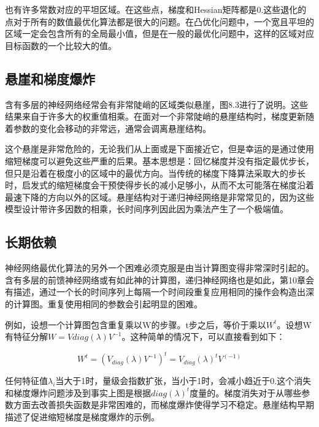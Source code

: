 也有许多常数对应的平坦区域。在这些点，梯度和Hessian矩阵都是0.这些退化的点对于所有的数值最优化算法都是很大的问题。在凸优化问题中，一个宽且平坦的区域一定会包含所有的全局最小值，但是在一般的最优化问题中，这样的区域对应目标函数的一个比较大的值。

\subsection{悬崖和梯度爆炸}

含有多层的神经网络经常会有非常陡峭的区域类似悬崖，图8.3进行了说明。这些结果来自于许多大的权重值相乘。在面对一个非常陡峭的悬崖结构时，梯度更新随着参数的变化会移动的非常远，通常会调离悬崖结构。


这个悬崖是非常危险的，无论我们从上面或是下面接近它，但是幸运的是通过使用缩短梯度可以避免这些严重的后果。基本思想是：回忆梯度并没有指定最优步长，但只是沿着在极度小的区域中的最优方向。当传统的梯度下降算法采取大的步长时，启发式的缩短梯度会干预使得步长的减小足够小，从而不太可能落在梯度沿着最速下降的方向以外的区域。悬崖结构对于递归神经网络是非常常见的，因为这些模型设计带许多因数的相乘，长时间序列因此因为乘法产生了一个极端值。

\subsection{长期依赖}

神经网络最优化算法的另外一个困难必须克服是由当计算图变得非常深时引起的。含有多层的前馈神经网络或有如此神的计算图，递归神经网络也是如此，第10章会有描述，通过一个长的时间序列上每隔一个时间段重复应用相同的操作会构造出深的计算图。重复使用相同的参数会引起明显的困难。

例如，设想一个计算图包含重复乘以W的步骤。t步之后，等价于乘以$W^t$。设想W有特征分解$W=Vdiag(\lambda)V^{-1}$。这种简单的情况下，可以直接看到如下：

\begin{equation}
W^t=(V_{diag}(\lambda)V^{-1})^t=V_{diag}(\lambda)^tV^{(-1)}
\end{equation}

任何特征值$\lambda_i$当大于1时，量级会指数扩张，当小于1时，会减小趋近于0.这个消失和梯度爆炸问题涉及到事实上图是根据$diag(\lambda)^t$度量的。梯度消失对于从哪些参数方面去改善损失函数是非常困难的，而梯度爆炸使得学习不稳定。悬崖结构早期描述了促进缩短梯度是梯度爆炸的示例。

